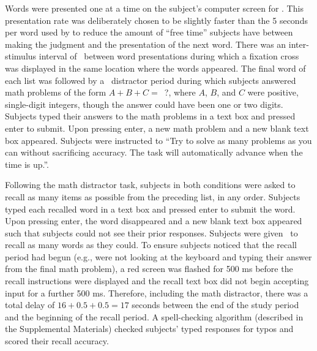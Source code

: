 \documentclass[man,natbib,floatsintext]{apa6} %
\begin{document}
Words were presented one at a time on the subject's computer screen for \presrate. This presentation rate was deliberately chosen to be slightly faster than the 5 seconds per word used by \citet{NairEtal17} to reduce the amount of ``free time'' subjects have between making the judgment and the presentation of the next word.
There was an inter-stimulus interval of \isi~between word presentations during which a fixation cross was displayed in the same location where the words appeared. The final word of each list was followed by a \DFRDelay~distractor period during which subjects answered math problems of the form $A+B+C=$~?, where $A$, $B$, and $C$ were positive, single-digit integers, though the answer could have been one or two digits. Subjects typed their answers to the math problems in a text box and pressed enter to submit. Upon pressing enter, a new math problem and a new blank text box appeared. Subjects were instructed to ``Try to solve as many problems as you can without sacrificing accuracy. The task will automatically advance when the time is up.''.

Following the math distractor task, subjects in both conditions were asked to recall as many items as possible from the preceding list, in any order. Subjects typed each recalled word in a text box and pressed enter to submit the word. Upon pressing enter, the word disappeared and a new blank text box appeared such that subjects could not see their prior responses. Subjects were given \recalltime~to recall as many words as they could. To ensure subjects noticed that the recall period had begun (e.g., were not looking at the keyboard and typing their answer from the final math problem), a red screen was flashed for 500 ms before the recall instructions were displayed and the recall text box did not begin accepting input for a further 500 ms. Therefore, including the math distractor, there was a total delay of $16+0.5+0.5=17$ seconds between the end of the study period and the beginning of the recall period. A spell-checking algorithm (described in the Supplemental Materials) checked subjects' typed responses for typos and scored their recall accuracy.
\end{document}
